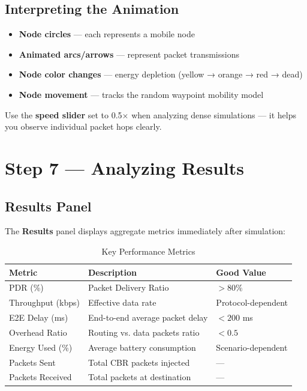 \documentclass[12pt,a4paper]{article}
\newenvironment{tipbox}
  {\begin{tcolorbox}[
      colback   = successgreen!8,
      colframe  = successgreen,
      fonttitle = \bfseries,
      title     = \textcolor{successgreen}{$\checkmark$\; Tip},
      breakable
  ]}
  {\end{tcolorbox}}
\begin{document}
\subsection{Interpreting the Animation}

\begin{itemize}[leftmargin=1.5em]
  \item \textbf{Node circles} — each represents a mobile node
  \item \textbf{Animated arcs/arrows} — represent packet transmissions
  \item \textbf{Node color changes} — energy depletion (yellow → orange → red → dead)
  \item \textbf{Node movement} — tracks the random waypoint mobility model
\end{itemize}

\begin{tipbox}
Use the \textbf{speed slider} set to 0.5$\times$ when analyzing dense simulations — it helps you observe individual packet hops clearly.
\end{tipbox}


\section{Step 7 — Analyzing Results}

\subsection{Results Panel}

The \textbf{Results} panel displays aggregate metrics immediately after simulation:

\begin{table}[H]
\centering
\caption{Key Performance Metrics}
\begin{tabular}{lll}
\toprule
\textbf{Metric}       & \textbf{Description}                    & \textbf{Good Value} \\
\midrule
PDR (\%)              & Packet Delivery Ratio                   & $>80\%$ \\
Throughput (kbps)     & Effective data rate                     & Protocol-dependent \\
E2E Delay (ms)        & End-to-end average packet delay         & $<200$ ms \\
Overhead Ratio        & Routing vs. data packets ratio          & $<0.5$ \\
Energy Used (\%)      & Average battery consumption             & Scenario-dependent \\
Packets Sent          & Total CBR packets injected              & --- \\
Packets Received      & Total packets at destination            & --- \\
\bottomrule
\end{tabular}
\end{table}
\end{document}
